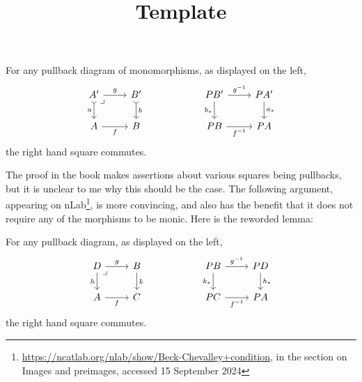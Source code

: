 \documentclass[../../solutions]{subfiles}
\title{Template}
\author{}
\begin{document}
\maketitle

%
\label{lemma:5.5.10}

\begin{lemma}
  For any pullback diagram of monomorphisms, as displayed on the left,
  $$
  \begin{tikzcd}
    A'
    \ar[r, "g"]
    \ar[d, rightarrowtail, "a"']
    \ar[dr, phantom, "\lrcorner", at start]
    & B'
    \ar[d, rightarrowtail, "b"]
    \\
    A
    \ar[r, "f"']
    & B
  \end{tikzcd}
  \hspace{2cm}
  \begin{tikzcd}
    PB'
    \ar[r, "g^{-1}"]
    \ar[d, "b_*"']
    & PA'
    \ar[d, "a_*"]
    \\
    PB
    \ar[r, "f^{-1}"']
    & PA
  \end{tikzcd}
  $$
  the right hand square commutes.
\end{lemma}

The proof in the book makes assertions about various squares being
pullbacks, but it is unclear to me why this should be the case.  The
following argument, appearing on nLab\footnote{%
  \url{https://ncatlab.org/nlab/show/Beck-Chevalley+condition}, in the
  section on Images and preimages, accessed 15 September 2024}, is
more convincing, and also has the benefit that it does not require any
of the morphisms to be monic.  Here is the reworded lemma:

\begin{mlemma}
  For any pullback diagram, as displayed on the left,
  $$
  \begin{tikzcd}
    D
    \ar[r, "g"]
    \ar[d, "h"']
    \ar[dr, phantom, "\lrcorner", at start]
    & B
    \ar[d, "k"]
    \\
    A
    \ar[r, "f"']
    & C
  \end{tikzcd}
  \hspace{2cm}
  \begin{tikzcd}
    PB
    \ar[r, "g^{-1}"]
    \ar[d, "k_*"']
    & PD
    \ar[d, "h_*"]
    \\
    PC
    \ar[r, "f^{-1}"']
    & PA
  \end{tikzcd}
  $$
  the right hand square commutes.
\end{mlemma}
\end{document}
